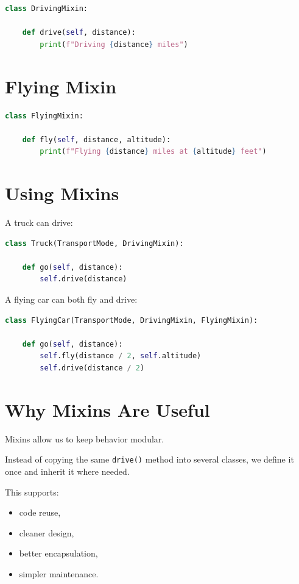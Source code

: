 \documentclass[11pt]{article}
\begin{document}
\begin{lstlisting}[language=Python]
class DrivingMixin:

    def drive(self, distance):
        print(f"Driving {distance} miles")
\end{lstlisting}

\section{Flying Mixin}

\begin{lstlisting}[language=Python]
class FlyingMixin:

    def fly(self, distance, altitude):
        print(f"Flying {distance} miles at {altitude} feet")
\end{lstlisting}

\section{Using Mixins}

A truck can drive:

\begin{lstlisting}[language=Python]
class Truck(TransportMode, DrivingMixin):

    def go(self, distance):
        self.drive(distance)
\end{lstlisting}

A flying car can both fly and drive:

\begin{lstlisting}[language=Python]
class FlyingCar(TransportMode, DrivingMixin, FlyingMixin):

    def go(self, distance):
        self.fly(distance / 2, self.altitude)
        self.drive(distance / 2)
\end{lstlisting}

\section{Why Mixins Are Useful}

Mixins allow us to keep behavior modular.

Instead of copying the same \texttt{drive()} method into several classes, we define it once and inherit it where needed.

This supports:

\begin{itemize}
    \item code reuse,
    \item cleaner design,
    \item better encapsulation,
    \item simpler maintenance.
\end{itemize}
\end{document}
